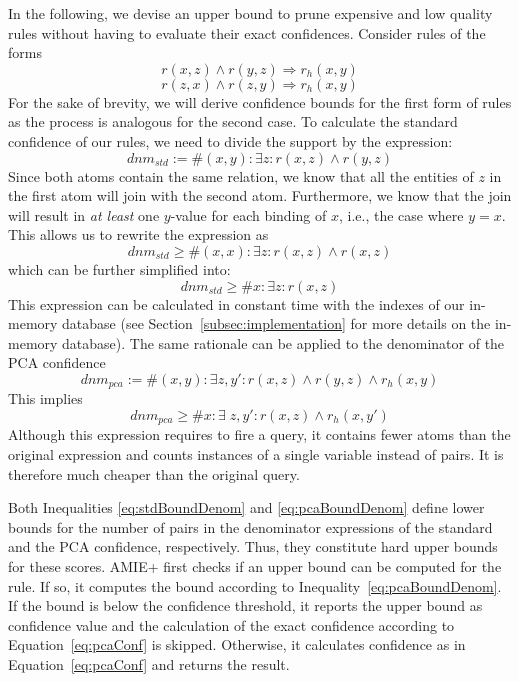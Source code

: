 {In the following, we devise an upper bound to prune expensive and low quality rules without having to evaluate their exact confidences.
Consider rules of the forms
$$ r(x,z) \wedge r(y,z) \Rightarrow r_h(x,y) $$
$$ r(z,x) \wedge r(z,y) \Rightarrow r_h(x,y) $$
For the sake of brevity, we will derive confidence bounds for the first form of rules as the process is analogous for the second case.
To calculate the standard confidence of our rules, we need to divide the support by the expression:
$$
dnm_{std} := \#(x,y): \exists z: r(x,z) \wedge r(y,z)
$$
Since both atoms contain the same relation, we know that all the entities of $z$ in the first atom
will join with the second atom. Furthermore,
we know that the join will result in \emph{at least} one $y$-value for each binding of $x$, i.e., the case where $y=x$. This allows us to rewrite
the expression as
$$
dnm_{std} \ge \#(x,x): \exists z:  r(x,z) \wedge r(x,z)
$$
which can be further simplified into:
\begin{equation}
 dnm_{std} \ge \#x: \exists z:  r(x,z)  \label{eq:stdBoundDenom}
\end{equation}
This expression can be calculated in constant time with the indexes of our in-memory database (see Section~\ref{subsec:implementation} for more details on the in-memory database).
The same rationale can be applied to the denominator of the PCA confidence
$$
dnm_{pca} := \#(x,y): \exists z, y': r(x,z) \wedge r(y,z) \wedge r_h(x,y)
$$
This implies
\begin{equation} \label{eq:pcaBoundDenom}
dnm_{pca} \ge \#x: \exists \;z, y': r(x,z) \wedge r_h(x,y')
\end{equation}
Although this expression requires to fire a query, it contains fewer atoms than the original expression and counts instances
of a single variable instead of pairs. It is therefore much cheaper than the original query.

Both Inequalities \ref{eq:stdBoundDenom} and \ref{eq:pcaBoundDenom}
define lower bounds for the number of pairs in the denominator expressions of the standard
and the PCA confidence, respectively. Thus, they constitute hard upper bounds for these scores.
AMIE+ first checks if an upper bound can be computed for the rule. If so, it computes the bound according to Inequality~\ref{eq:pcaBoundDenom}.
If the bound is below the confidence threshold, it reports the upper bound as confidence value and the calculation of the exact confidence according to Equation~\ref{eq:pcaConf} is skipped.
Otherwise, it calculates confidence as in Equation~\ref{eq:pcaConf} and returns the result.


}
